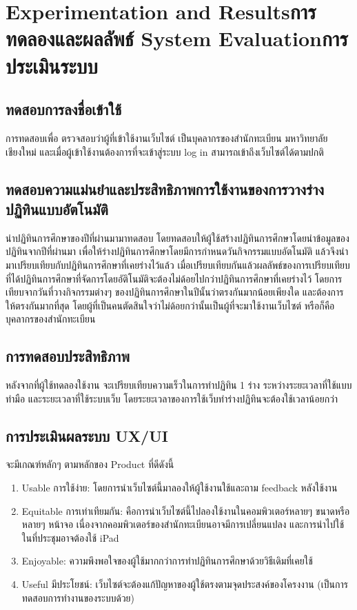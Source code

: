 \chapter{\ifproject%
\ifenglish Experimentation and Results\else การทดลองและผลลัพธ์\fi
\else%
\ifenglish System Evaluation\else การประเมินระบบ\fi
\fi}
\section{ทดสอบการลงชื่อเข้าใช้} 
   การทดสอบเพื่อ ตรวจสอบว่าผู้ที่เข้าใช้งานเว็บไซต์ เป็นบุคลากรของสำนักทะเบียน มหาวิทยาลัยเชียงใหม่ 
และเมื่อผู้เข้าใช้งานต้องการที่จะเข้าสู่ระบบ log in สามารถเข้าถึงเว็บไซต์ได้ตามปกติ

\section{ทดสอบความแม่นยำและประสิทธิภาพการใช้งานของการวางร่างปฏิทินแบบอัตโนมัติ}
   นำปฏิทินการศึกษาของปีที่ผ่านมามาทดสอบ โดยทดสอบให้ผู้ใช้สร้างปฏิทินการศึกษาโดยนำข้อมูลของปฏิทินจากปีที่ผ่านมา 
เพื่อให้ร่างปฏิทินการศึกษาโดยมีการกำหนดวันกิจกรรมแบบอัตโนมัติ แล้วจึงนำมาเปรียบเทียบกับปฏิทินการศึกษาที่เคยร่างไว้แล้ว 
เมื่อเปรียบเทียบกันแล้วผลลัพธ์ของการเปรียบเทียบที่ได้ปฏิทินการศึกษาที่จัดการโดยอัติโนมัติจะต้องไม่ด้อยไปกว่าปฏิทินการศึกษาที่เคยร่างไว้
โดยการเทียบจากวันที่วางกิจกรรมต่างๆ ของปฏิทินการศึกษาในปีนั้นว่าตรงกันมากน้อยเพียงใด และต้องการให้ตรงกันมากที่สุด
โดยผู้ที่เป็นคนตัดสินใจว่าไม่ด้อยกว่านั้นเป็นผู้ที่จะมาใช้งานเว็บไซต์ หรือก็คือบุคลากรของสำนักทะเบียน

\section{การทดสอบประสิทธิภาพ}
หลังจากที่ผู้ใช้ทดลองใช้งาน จะเปรียบเทียบความเร็วในการทำปฏิทิน 1 ร่าง ระหว่างระยะเวลาที่ใช้แบบทำมือ
และระยะเวลาที่ใช้ระบบเว็บ โดยระยะเวลาของการใช้เว็บทำร่างปฏิทินจะต้องใช้เวลาน้อยกว่า

\section{การประเมินผลระบบ UX/UI } 
จะมีเกณฑ์หลักๆ ตามหลักของ Product ที่ดีดังนี้
\begin{enumerate}
   \item Usable การใช้ง่าย: โดยการนำเว็บไซต์นี้มาลองให้ผู้ใช้งานใช้และถาม feedback หลังใช้งาน
   \item Equitable การเท่าเทียมกัน: คือการนำเว็บไซต์นี้ไปลองใช้งานในคอมพิวเตอร์หลายๆ ขนาดหรือหลายๆ หน้าจอ เนื่องจากคอมพิวเตอร์ของสำนักทะเบียนอาจมีการเปลี่ยนแปลง และการนำไปใช้ในที่ประชุมอาจต้องใช้ iPad
   \item Enjoyable: ความพึงพอใจของผู้ใช้มากกว่าการทำปฏิทินการศึกษาด้วยวิธีเดิมที่เคยใช้
   \item Useful มีประโยชน์: เว็บไซต์จะต้องแก้ปัญหาของผู้ใช้ตรงตามจุดประสงค์ของโครงงาน (เป็นการทดสอบการทำงานของระบบด้วย)
\end{enumerate}
